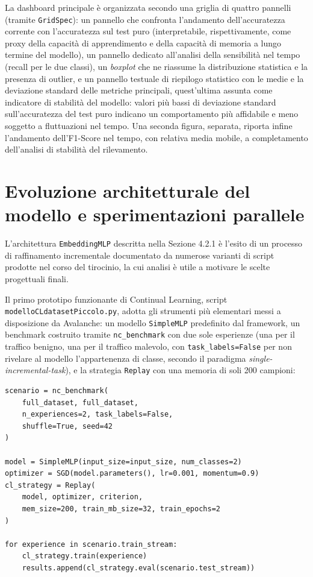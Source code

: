 \documentclass[12pt,a4paper]{report}
\begin{document}
La dashboard principale è organizzata secondo una griglia di quattro pannelli (tramite \texttt{GridSpec}): un pannello che confronta l'andamento dell'accuratezza corrente con l'accuratezza sul test puro (interpretabile, rispettivamente, come proxy della capacità di apprendimento e della capacità di memoria a lungo termine del modello), un pannello dedicato all'analisi della sensibilità nel tempo (recall per le due classi), un \emph{boxplot} che ne riassume la distribuzione statistica e la presenza di outlier, e un pannello testuale di riepilogo statistico con le medie e la deviazione standard delle metriche principali, quest'ultima assunta come indicatore di stabilità del modello: valori più bassi di deviazione standard sull'accuratezza del test puro indicano un comportamento più affidabile e meno soggetto a fluttuazioni nel tempo. Una seconda figura, separata, riporta infine l'andamento dell'F1-Score nel tempo, con relativa media mobile, a completamento dell'analisi di stabilità del rilevamento.

\section{Evoluzione architetturale del modello e sperimentazioni parallele}

L'architettura \texttt{EmbeddingMLP} descritta nella Sezione 4.2.1 è l'esito di un processo di raffinamento incrementale documentato da numerose varianti di script prodotte nel corso del tirocinio, la cui analisi è utile a motivare le scelte progettuali finali.

Il primo prototipo funzionante di Continual Learning, script \texttt{modelloCLdatasetPiccolo.py}, adotta gli strumenti più elementari messi a disposizione da Avalanche: un modello \texttt{SimpleMLP} predefinito dal framework, un benchmark costruito tramite \texttt{nc\_benchmark} con due sole esperienze (una per il traffico benigno, una per il traffico malevolo, con \texttt{task\_labels=False} per non rivelare al modello l'appartenenza di classe, secondo il paradigma \emph{single-incremental-task}), e la strategia \texttt{Replay} con una memoria di soli 200 campioni:

\begin{lstlisting}[caption={Primo prototipo di Continual Learning con Avalanche (\texttt{modelloCLdatasetPiccolo.py})}]
scenario = nc_benchmark(
    full_dataset, full_dataset,
    n_experiences=2, task_labels=False,
    shuffle=True, seed=42
)

model = SimpleMLP(input_size=input_size, num_classes=2)
optimizer = SGD(model.parameters(), lr=0.001, momentum=0.9)
cl_strategy = Replay(
    model, optimizer, criterion,
    mem_size=200, train_mb_size=32, train_epochs=2
)

for experience in scenario.train_stream:
    cl_strategy.train(experience)
    results.append(cl_strategy.eval(scenario.test_stream))
\end{lstlisting}
\end{document}
